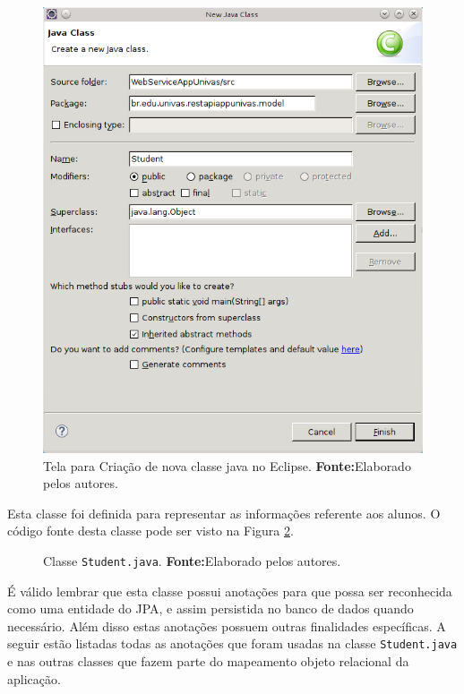 	 \begin{figure}[h!]
		\centerline{\includegraphics[scale=0.8]{./imagens/2_q_metodologico/4_procedimentos_resultados/43_webservice/432_desenvolvimento/desws10.png}}
		\caption[Tela para Criação de nova classe java no Eclipse]{Tela para Criação
		de nova classe java no Eclipse.
			\textbf{Fonte:}Elaborado pelos autores.}
		\label{fig:desws10}
	\end{figure}
	
	\pagebreak

	\par Esta classe foi definida para representar as informações referente aos
alunos. O código fonte desta classe pode ser visto na Figura \ref{fig:desws11}. 
	
	
	\begin{figure}[h!]
		
		\caption[Classe Student.java]{Classe \texttt{Student.java}.
			\textbf{Fonte:}Elaborado pelos autores.}
		\label{fig:desws11}
	\end{figure}
	
	\pagebreak
	
	\par É válido lembrar que esta classe possui anotações para que possa ser
reconhecida como uma entidade do JPA, e assim persistida no banco de dados
quando necessário. Além disso estas anotações possuem outras finalidades
específicas. A seguir estão listadas todas as anotações  que foram usadas na
classe \texttt{Student.java} e nas outras classes que fazem parte do mapeamento
objeto relacional da aplicação.

